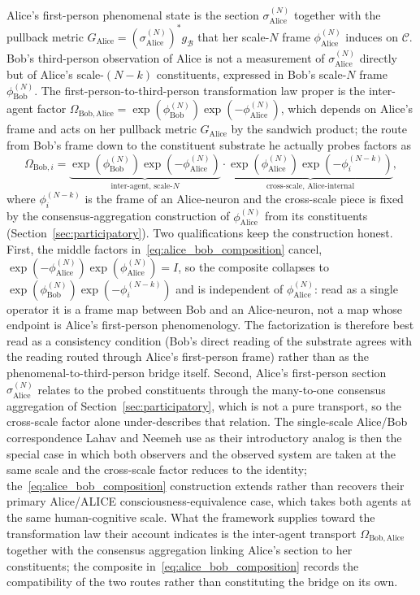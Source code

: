 \documentclass[11pt]{article}
\begin{document}
Alice's first-person phenomenal state is the section $\sigma_{\mathrm{Alice}}^{(N)}$ together with the pullback metric $G_{\mathrm{Alice}} = (\sigma_{\mathrm{Alice}}^{(N)})^* g_{\mathcal{B}}$ that her scale-$N$ frame $\phi_{\mathrm{Alice}}^{(N)}$ induces on $\mathcal{C}$. Bob's third-person observation of Alice is not a measurement of $\sigma_{\mathrm{Alice}}^{(N)}$ directly but of Alice's scale-$(N-k)$ constituents, expressed in Bob's scale-$N$ frame $\phi_{\mathrm{Bob}}^{(N)}$. The first-person-to-third-person transformation law proper is the inter-agent factor $\Omega_{\mathrm{Bob},\mathrm{Alice}} = \exp(\phi_{\mathrm{Bob}}^{(N)}) \exp(-\phi_{\mathrm{Alice}}^{(N)})$, which depends on Alice's frame and acts on her pullback metric $G_{\mathrm{Alice}}$ by the sandwich product; the route from Bob's frame down to the constituent substrate he actually probes factors as
\begin{equation}
\Omega_{\mathrm{Bob}, i}
=
\underbrace{\exp(\phi_{\mathrm{Bob}}^{(N)}) \exp(-\phi_{\mathrm{Alice}}^{(N)})}_{\text{inter-agent, scale-}N}
\cdot
\underbrace{\exp(\phi_{\mathrm{Alice}}^{(N)}) \exp(-\phi_{i}^{(N-k)})}_{\text{cross-scale, Alice-internal}},
\label{eq:alice_bob_composition}
\end{equation}
where $\phi_i^{(N-k)}$ is the frame of an Alice-neuron and the cross-scale piece is fixed by the consensus-aggregation construction of $\phi_{\mathrm{Alice}}^{(N)}$ from its constituents (Section~\ref{sec:participatory}). Two qualifications keep the construction honest. First, the middle factors in~\eqref{eq:alice_bob_composition} cancel, $\exp(-\phi_{\mathrm{Alice}}^{(N)}) \exp(\phi_{\mathrm{Alice}}^{(N)}) = I$, so the composite collapses to $\exp(\phi_{\mathrm{Bob}}^{(N)}) \exp(-\phi_i^{(N-k)})$ and is independent of $\phi_{\mathrm{Alice}}^{(N)}$: read as a single operator it is a frame map between Bob and an Alice-neuron, not a map whose endpoint is Alice's first-person phenomenology. The factorization is therefore best read as a consistency condition (Bob's direct reading of the substrate agrees with the reading routed through Alice's first-person frame) rather than as the phenomenal-to-third-person bridge itself. Second, Alice's first-person section $\sigma_{\mathrm{Alice}}^{(N)}$ relates to the probed constituents through the many-to-one consensus aggregation of Section~\ref{sec:participatory}, which is not a pure transport, so the cross-scale factor alone under-describes that relation. The single-scale Alice/Bob correspondence Lahav and Neemeh use as their introductory analog is then the special case in which both observers and the observed system are taken at the same scale and the cross-scale factor reduces to the identity; the~\eqref{eq:alice_bob_composition} construction extends rather than recovers their primary Alice/ALICE consciousness-equivalence case, which takes both agents at the same human-cognitive scale. What the framework supplies toward the transformation law their account indicates is the inter-agent transport $\Omega_{\mathrm{Bob},\mathrm{Alice}}$ together with the consensus aggregation linking Alice's section to her constituents; the composite in~\eqref{eq:alice_bob_composition} records the compatibility of the two routes rather than constituting the bridge on its own.
\end{document}
